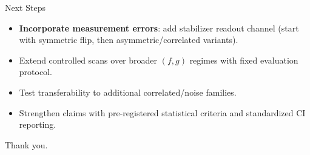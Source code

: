 \documentclass[10pt,aspectratio=169]{beamer}
\begin{document}
\begin{frame}{Next Steps}
  \begin{itemize}
    \item \textbf{Incorporate measurement errors}: add stabilizer readout channel (start with symmetric flip, then asymmetric/correlated variants).
    \item Extend controlled scans over broader $(f,g)$ regimes with fixed evaluation protocol.
    \item Test transferability to additional correlated/noise families.
    \item Strengthen claims with pre-registered statistical criteria and standardized CI reporting.
  \end{itemize}
\end{frame}

\begin{frame}
  \centering
  \Large Thank you.
\end{frame}
\end{document}
